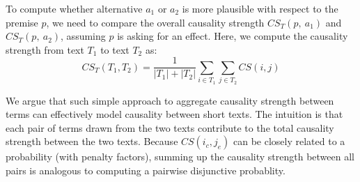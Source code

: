 To compute whether alternative $a_1$ or $a_2$ is more plausible
with respect to the premise $p$, we need to compare the overall causality
strength $CS_T(p,~a_1)$ and $CS_T(p,~a_2)$, assuming $p$ is asking
for an effect. Here, we compute the causality strength from 
text $T_1$ to text $T_2$ as:
\begin{equation}
CS_T(T_1,T_2)=\frac{1}{|T_1|+|T_2|}\sum_{i \in T_1}\sum_{j \in T_2}
CS(i, j)
\label{eq:csall}
\end{equation}



We argue that such simple approach to aggregate causality strength between terms
can effectively model causality between short texts. 
The intuition is that each pair of terms drawn from the two texts contribute
to the total causality strength between the two texts. Because $CS(i_c, j_e)$ 
can be closely related to a probability (with penalty factors), 
summing up the causality strength between all pairs is analogous to
computing a pairwise disjunctive probablity.

